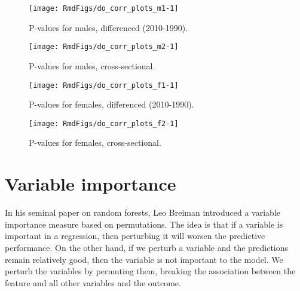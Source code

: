 \documentclass[11pt]{article}\usepackage[]{graphicx}\usepackage[]{color}
\makeatletter
\def\maxwidth{ %
  \ifdim\Gin@nat@width>\linewidth
    \linewidth
  \else
    \Gin@nat@width
  \fi
}
\newenvironment{knitrout}{}{} %
\makeatother
\begin{document}
\begin{knitrout}
\color{fgcolor}\begin{figure}
\texttt{[image: RmdFigs/do\_corr\_plots\_m1-1]} \caption[P-values for males, differenced (2010-1990)]{P-values for males, differenced (2010-1990).}\label{fig:do_corr_plots_m1}
\end{figure}


\end{knitrout}
\begin{knitrout}
\color{fgcolor}\begin{figure}
\texttt{[image: RmdFigs/do\_corr\_plots\_m2-1]} \caption[P-values for males, cross-sectional]{P-values for males, cross-sectional.}\label{fig:do_corr_plots_m2}
\end{figure}


\end{knitrout}
\clearpage
\begin{knitrout}
\color{fgcolor}\begin{figure}
\texttt{[image: RmdFigs/do\_corr\_plots\_f1-1]} \caption[P-values for females, differenced (2010-1990)]{P-values for females, differenced (2010-1990).}\label{fig:do_corr_plots_f1}
\end{figure}


\end{knitrout}
\begin{knitrout}
\color{fgcolor}\begin{figure}
\texttt{[image: RmdFigs/do\_corr\_plots\_f2-1]} \caption[P-values for females, cross-sectional]{P-values for females, cross-sectional.}\label{fig:do_corr_plots_f2}
\end{figure}


\end{knitrout}

\clearpage
\section{Variable importance}

In his seminal paper on random forests, Leo Breiman introduced a variable importance measure based on permutations. 
The idea is that if a variable is important in a regression, then perturbing it will worsen the predictive performance. 
On the other hand, if we perturb a variable and the predictions remain relatively good, then the variable is not important to the model. 
We perturb the variables by permuting them, breaking the association between the feature and all other variables and the outcome.
\end{document}
